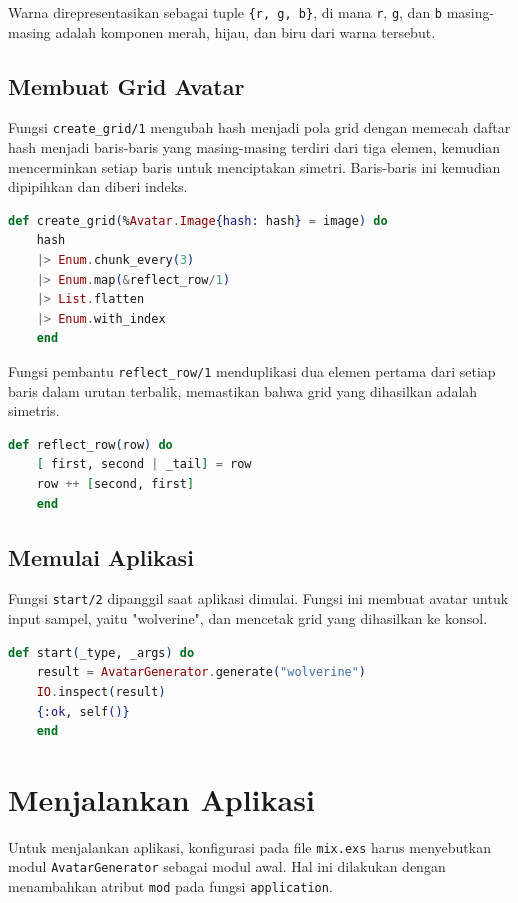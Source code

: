 Warna direpresentasikan sebagai tuple \texttt{\{r, g, b\}}, di mana \texttt{r}, \texttt{g}, dan \texttt{b} masing-masing adalah komponen merah, hijau, dan biru dari warna tersebut.

\subsection{Membuat Grid Avatar}
Fungsi \texttt{create\_grid/1} mengubah hash menjadi pola grid dengan memecah daftar hash menjadi baris-baris yang masing-masing terdiri dari tiga elemen, kemudian mencerminkan setiap baris untuk menciptakan simetri. Baris-baris ini kemudian dipipihkan dan diberi indeks.

\begin{lstlisting}[language=Elixir, caption={Membuat grid avatar}]
	def create_grid(%Avatar.Image{hash: hash} = image) do
	hash
	|> Enum.chunk_every(3)
	|> Enum.map(&reflect_row/1)
	|> List.flatten
	|> Enum.with_index
	end
\end{lstlisting}

Fungsi pembantu \texttt{reflect\_row/1} menduplikasi dua elemen pertama dari setiap baris dalam urutan terbalik, memastikan bahwa grid yang dihasilkan adalah simetris.

\begin{lstlisting}[language=Elixir, caption={Mencerminkan baris untuk menciptakan simetri}]
	def reflect_row(row) do
	[ first, second | _tail] = row
	row ++ [second, first]
	end
\end{lstlisting}

\subsection{Memulai Aplikasi}
Fungsi \texttt{start/2} dipanggil saat aplikasi dimulai. Fungsi ini membuat avatar untuk input sampel, yaitu "wolverine", dan mencetak grid yang dihasilkan ke konsol.

\begin{lstlisting}[language=Elixir, caption={Memulai aplikasi dan membuat avatar}]
	def start(_type, _args) do
	result = AvatarGenerator.generate("wolverine")
	IO.inspect(result)
	{:ok, self()}
	end
\end{lstlisting}

\section{Menjalankan Aplikasi}
Untuk menjalankan aplikasi, konfigurasi pada file \texttt{mix.exs} harus menyebutkan modul \texttt{AvatarGenerator} sebagai modul awal. Hal ini dilakukan dengan menambahkan atribut \texttt{mod} pada fungsi \texttt{application}.

